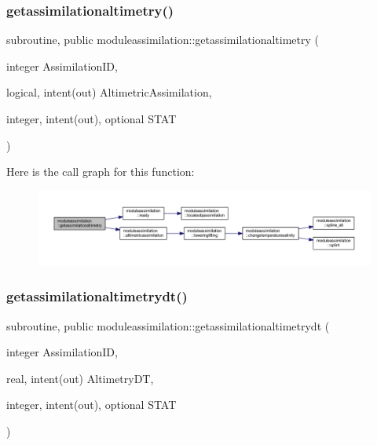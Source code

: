 \subsubsection{\texorpdfstring{getassimilationaltimetry()}{getassimilationaltimetry()}}
{\footnotesize\ttfamily subroutine, public moduleassimilation\+::getassimilationaltimetry (\begin{DoxyParamCaption}\item[{integer}]{Assimilation\+ID,  }\item[{logical, intent(out)}]{Altimetric\+Assimilation,  }\item[{integer, intent(out), optional}]{S\+T\+AT }\end{DoxyParamCaption})}

Here is the call graph for this function\+:\nopagebreak
\begin{figure}[H]
\begin{center}
\leavevmode
\includegraphics[width=350pt]{namespacemoduleassimilation_ae8923d911da53170ca8bc79256ecfaee_cgraph}
\end{center}
\end{figure}
\mbox{\label{namespacemoduleassimilation_a4c4fab1da99106327a65575667e03252}} 
\subsubsection{\texorpdfstring{getassimilationaltimetrydt()}{getassimilationaltimetrydt()}}
{\footnotesize\ttfamily subroutine, public moduleassimilation\+::getassimilationaltimetrydt (\begin{DoxyParamCaption}\item[{integer}]{Assimilation\+ID,  }\item[{real, intent(out)}]{Altimetry\+DT,  }\item[{integer, intent(out), optional}]{S\+T\+AT }\end{DoxyParamCaption})}

